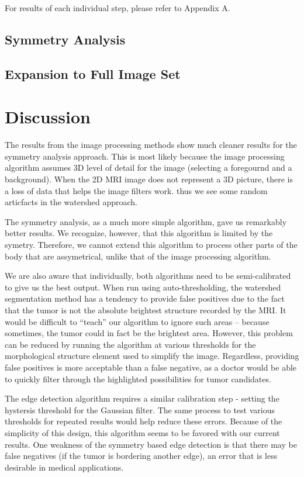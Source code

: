 \documentclass[12pt]{article}
\theoremstyle{plain}%
\theoremstyle{definition}
\theoremstyle{remark}
\begin{document}
For results of each individual step, please refer to Appendix A.

\subsection{Symmetry Analysis}

\subsection{Expansion to Full Image Set}

\section{Discussion}

The results from the image processing methods show much cleaner results for the symmetry analysis approach.  This is most likely because the image processing algorithm assumes 3D level of detail for the image (selecting a foregournd and a background).  When the 2D MRI image does not represent a 3D picture, there is a loss of data that helps the image filters work.  thus we see some random articfacts in the watershed approach.

The symmetry analysis, as a much more simple algorithm, gave us remarkably better results.  We recognize, however, that this algorithm is limited by the symetry.  Therefore, we cannot extend this algorithm to process other parts of the body that are assymetrical, unlike that of the image processing algorithm.

We are also aware that individually, both algorithms need to be semi-calibrated to give us the best output.  When run using auto-thresholding, the watershed segmentation method has a tendency to provide false positives due to the fact that the tumor is not the absolute brightest structure recorded by the MRI.  It would be difficult to “teach” our algorithm to ignore such areas – because sometimes, the tumor could in fact be the brightest area.  However, this problem can be reduced by running the algorithm at various thresholds for the morphological structure element used to simplify the image.  Regardless, providing false positives is more acceptable than a false negative, as a doctor would be able to quickly filter through the highlighted possibilities for tumor candidates.

The edge detection algorithm requires a similar calibration step - setting the hystersis threshold for the Gaussian filter.  The same process to test various thresholds for repeated results would help reduce these errors.  Because of the simplicity of this design, this algorithm seems to be favored with our current results.  One weakness of the symmetry based edge detection is that there may be false negatives (if the tumor is bordering another edge), an error that is less desirable in medical applications.
\end{document}

